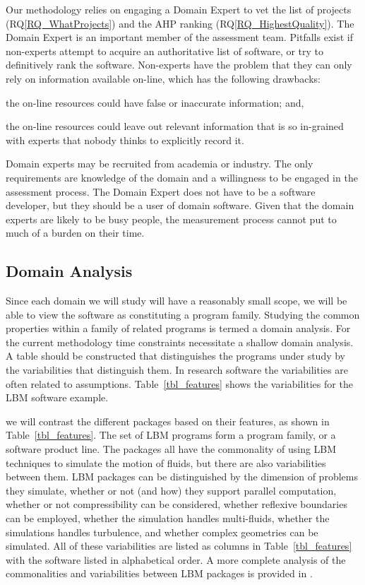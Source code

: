 \documentclass[runningheads]{llncs}
\newcommand{\rqref}[1]{RQ\ref{#1}}
\begin{document}
Our methodology relies on engaging a Domain Expert to vet the list of projects
(\rqref{RQ_WhatProjects}) and the AHP ranking (\rqref{RQ_HighestQuality}).  The
Domain Expert is an important member of the assessment
team. Pitfalls exist if non-experts attempt to acquire an authoritative list of
software, or try to definitively rank the software. Non-experts have the problem
that they can only rely on information available on-line, which has the
following drawbacks:
\begin{inparaenum}[i)]
  \item the on-line resources could have false or inaccurate information; and,
  \item the on-line resources could leave out relevant information that is so
in-grained with experts that nobody thinks to explicitly record it.
\end{inparaenum}
Domain experts may be recruited from academia or industry.  The only
requirements are knowledge of the domain and a willingness to be engaged in the
assessment process.  The Domain Expert does not have to be a software developer,
but they should be a user of domain software.  Given that the domain experts are
likely to be busy people, the measurement process cannot put to much of a burden
on their time.

\subsection{Domain Analysis} \label{SecDomainAnalysis}

Since each domain we will study will have a reasonably small scope, we will be
able to view the software as constituting a program family. Studying the common
properties within a family of related programs is termed a domain analysis.  For
the current methodology time constraints necessitate a shallow domain analysis.
A table should be constructed that distinguishes the programs under study by the
variabilities that distinguish them.  In research software the variabilities are
often related to assumptions.  Table~\ref{tbl_features} shows the variabilities
for the LBM software example.

we will
contrast the different packages based on their features, as shown in
Table~\ref{tbl_features}. The set of LBM programs form a program family, or a
software product line.  The packages all have the commonality of using LBM
techniques to simulate the motion of fluids, but there are also variabilities
between them.  LBM packages can be distinguished by the dimension of problems
they simulate, whether or not (and how) they support parallel computation,
whether or not compressibility can be considered, whether reflexive boundaries
can be employed, whether the simulation handles multi-fluids, whether the
simulations handles turbulence, and whether complex geometries can be simulated.
All of these variabilities are listed as columns in Table~\ref{tbl_features}
with the software listed in alphabetical order. A more complete analysis of the
commonalities and variabilities between LBM packages is provided in
\cite{Michalski2021}.
\end{document}
